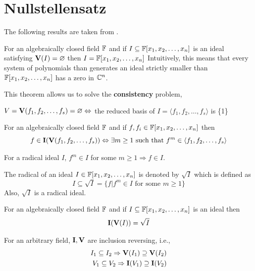 \documentclass[a4paper,11pt]{article}
\begin{document}
\section{Nullstellensatz}{\label{sec:nullstellensatz}}
The following results are taken from \cite{book:coxlittleoshea}.
\begin{theorem}
    For an algebraically closed field $\mathbb{F}$ and if $I\subseteq\mathbb{F}[x_1, x_2, \ldots, x_n]$ is an ideal satisfying $\textbf{V}(I)=\varnothing$ then $I=\mathbb{F}[x_1, x_2, \ldots, x_n]$
    Intuitively, this means that every system of polynomials than generates an ideal strictly smaller than $\mathbb{F}[x_1, x_2, \ldots, x_n]$ has a zero in $\mathbb{C}^n$.
\end{theorem}
This theorem allows us to solve the \textbf{consistency} problem,
\begin{cor}
    $V = \textbf{V}(f_1,f_2,\ldots,f_s)=\varnothing \Leftrightarrow$ the reduced \Grob basis of $I=\langle f_1,f_2,\ldots,f_s\rangle$ is \{1\}
\end{cor}
\begin{theorem}
    For an algebraically closed field $\mathbb{F}$ and if $f, f_i\in\mathbb{F}[x_1, x_2, \ldots, x_n]$ then
    \begin{equation}
        f \in \textbf{I}(\textbf{V}(f_1,f_2,\ldots,f_s)) \Leftrightarrow \exists m\geq1 \text{ such that } f^m \in \langle f_1,f_2,\ldots,f_s\rangle
    \end{equation}
\end{theorem}
\begin{defn}
    For a radical ideal $I$, $f^m\in I$ for some $m\geq1\Rightarrow f\in I$.
\end{defn}
\begin{defn}
    The radical of an ideal $I\in\mathbb{F}[x_1, x_2, \ldots, x_n]$ is denoted by $\sqrt{I}$ which is defined as
    \begin{equation}
        I \subseteq \sqrt{I}=\{f|f^m\in I \text{ for some $m\geq1$}\} 
    \end{equation}
    Also, $\sqrt{I}$ is a radical ideal.
\end{defn}
\begin{theorem}
    For an algebraically closed field $\mathbb{F}$ and if $I\subseteq\mathbb{F}[x_1, x_2, \ldots, x_n]$ is an ideal then
    \begin{equation}
        \textbf{I}(\textbf{V}(I))=\sqrt{I}
    \end{equation}
\end{theorem}
\begin{theorem}  
    For an arbitrary field, $\textbf{I},\textbf{V}$ are inclusion reversing, i.e.,
    \begin{equation}
        \begin{aligned}
            I_1\subseteq I_2\Rightarrow \textbf{V}(I_1)\supseteq \textbf{V}(I_2)\\
            V_1\subseteq V_2\Rightarrow \textbf{I}(V_1)\supseteq \textbf{I}(V_2)
        \end{aligned}
    \end{equation}
\end{theorem}
\clearpage
\end{document}
